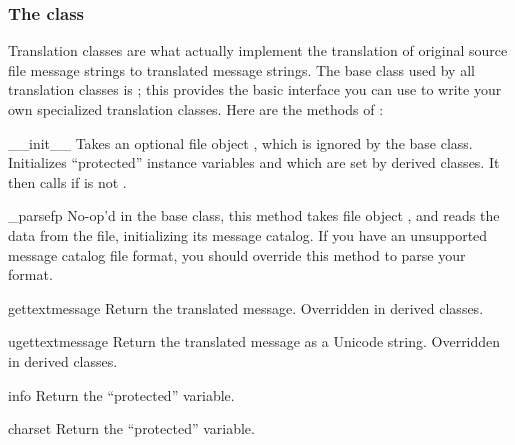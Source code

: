 \subsubsection{The  class}
Translation classes are what actually implement the translation of
original source file message strings to translated message strings.
The base class used by all translation classes is
; this provides the basic interface you can use
to write your own specialized translation classes.  Here are the
methods of :

\begin{methoddesc}[NullTranslations]{__init__}{}
Takes an optional file object , which is ignored by the base
class.  Initializes ``protected'' instance variables  and
 which are set by derived classes.  It then calls
 if  is not .
\end{methoddesc}

\begin{methoddesc}[NullTranslations]{_parse}{fp}
No-op'd in the base class, this method takes file object , and
reads the data from the file, initializing its message catalog.  If
you have an unsupported message catalog file format, you should
override this method to parse your format.
\end{methoddesc}

\begin{methoddesc}[NullTranslations]{gettext}{message}
Return the translated message.  Overridden in derived classes.
\end{methoddesc}

\begin{methoddesc}[NullTranslations]{ugettext}{message}
Return the translated message as a Unicode string.  Overridden in
derived classes.
\end{methoddesc}

\begin{methoddesc}[NullTranslations]{info}{}
Return the ``protected''  variable.
\end{methoddesc}

\begin{methoddesc}[NullTranslations]{charset}{}
Return the ``protected''  variable.
\end{methoddesc}

